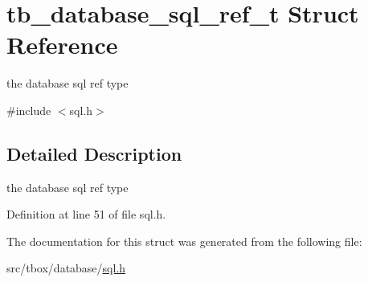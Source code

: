 \hypertarget{structtb__database__sql__ref__t}{\section{tb\-\_\-database\-\_\-sql\-\_\-ref\-\_\-t Struct Reference}
\label{structtb__database__sql__ref__t}
}


the database sql ref type  




{\ttfamily \#include $<$sql.\-h$>$}



\subsection{Detailed Description}
the database sql ref type 

Definition at line 51 of file sql.\-h.



The documentation for this struct was generated from the following file\-:\begin{DoxyCompactItemize}
\item 
src/tbox/database/\hyperlink{sql_8h}{sql.\-h}\end{DoxyCompactItemize}
